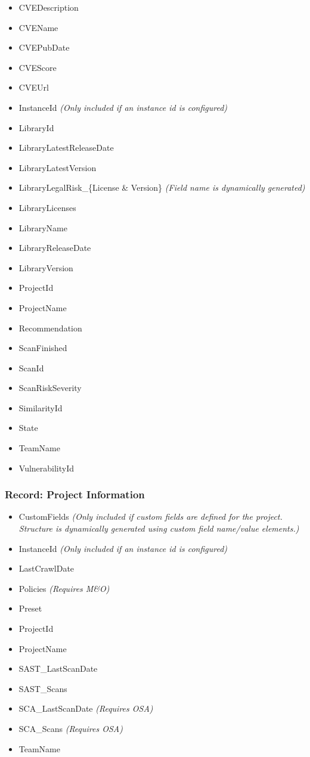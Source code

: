 \begin{itemize}
    \item CVEDescription
    \item CVEName
    \item CVEPubDate
    \item CVEScore
    \item CVEUrl
    \item InstanceId \textit{(Only included if an instance id is configured)}
    \item LibraryId
    \item LibraryLatestReleaseDate
    \item LibraryLatestVersion
    \item LibraryLegalRisk\_\{License \& Version\} \textit{(Field name is dynamically generated)}
    \item LibraryLicenses
    \item LibraryName
    \item LibraryReleaseDate
    \item LibraryVersion
    \item ProjectId
    \item ProjectName
    \item Recommendation
    \item ScanFinished
    \item ScanId
    \item ScanRiskSeverity
    \item SimilarityId
    \item State
    \item TeamName
    \item VulnerabilityId    
\end{itemize}


\subsubsection{Record: Project Information}

\begin{itemize}
    \item CustomFields \textit{(Only included if custom fields are defined for the project.  Structure is dynamically generated using custom field name/value elements.)}
    \item InstanceId \textit{(Only included if an instance id is configured)}
    \item LastCrawlDate
    \item Policies \textit{(Requires M\&O)}
    \item Preset
    \item ProjectId
    \item ProjectName
    \item SAST\_LastScanDate
    \item SAST\_Scans
    \item SCA\_LastScanDate \textit{(Requires OSA)}
    \item SCA\_Scans \textit{(Requires OSA)}
    \item TeamName
\end{itemize}



